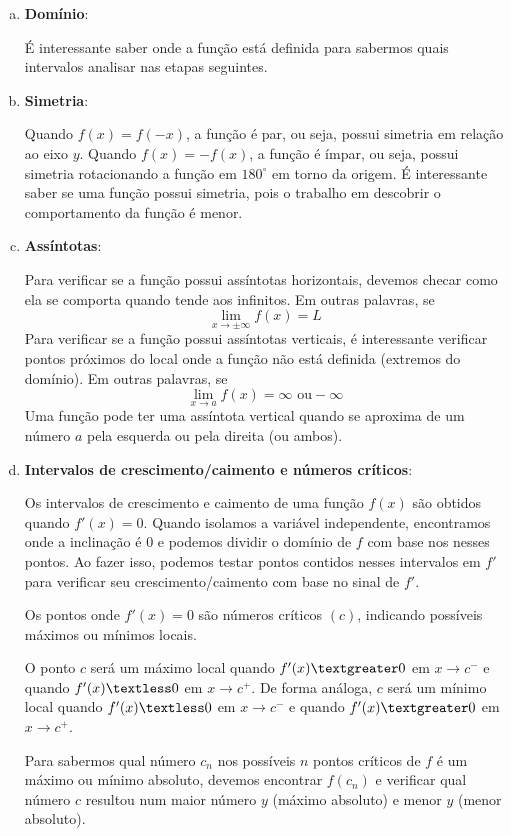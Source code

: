 \begin{enumerate}[a.]
	
	\item \textbf{Domínio}:
	
	É interessante saber onde a função está definida para sabermos quais intervalos analisar nas etapas seguintes.
	
	\item \textbf{Simetria}:
	
	Quando $f(x)=f(-x)$, a função é par, ou seja, possui simetria em relação ao eixo $y$.
	Quando $f(x)=-f(x)$, a função é ímpar, ou seja, possui simetria rotacionando a função em $180^{\circ}$ em torno da origem.
	É interessante saber se uma função possui simetria, pois o trabalho em descobrir o comportamento da função é menor.
	
	\item \textbf{Assíntotas}:
	
	Para verificar se a função possui assíntotas horizontais, devemos checar como ela se comporta quando tende aos infinitos. Em outras palavras, se $$\lim_{x \rightarrow \pm \infty} f(x) = L$$
	Para verificar se a função possui assíntotas verticais, é interessante verificar pontos próximos do local onde a função não está definida (extremos do domínio). Em outras palavras, se $$\lim_{x \rightarrow a} f(x) = \infty \text{ ou} -\infty$$
	Uma função pode ter uma assíntota vertical quando se aproxima de um número $a$ pela esquerda ou pela direita (ou ambos).
	
	\item \textbf{Intervalos de crescimento/caimento e números críticos}:
	
	Os intervalos de crescimento e caimento de uma função $f(x)$ são obtidos quando $f'(x) = 0$. Quando isolamos a variável independente, encontramos onde a inclinação é $0$ e podemos dividir o domínio de $f$ com base nos nesses pontos. Ao fazer isso, podemos testar pontos contidos nesses intervalos em $f'$ para verificar seu crescimento/caimento com base no sinal de $f'$.
	
	Os pontos onde $f'(x) = 0$ são números críticos $(c)$, indicando possíveis máximos ou mínimos locais.
	
	O ponto $c$ será um máximo local quando $f'(x) \textgreater 0$ em $x \rightarrow c^-$ e quando $f'(x) \textless 0$ em $x \rightarrow c^+$. De forma análoga, $c$ será um mínimo local quando $f'(x) \textless 0$ em $x \rightarrow c^-$ e quando $f'(x) \textgreater 0$ em $x \rightarrow c^+$.
	
	Para sabermos qual número $c_n$ nos possíveis $n$ pontos críticos de $f$ é um máximo ou mínimo absoluto, devemos encontrar $f(c_n)$ e verificar qual número $c$ resultou num maior número $y$ (máximo absoluto) e menor $y$ (menor absoluto).
	

\end{enumerate}
